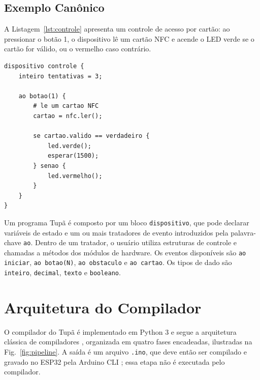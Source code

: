 \documentclass[conference]{IEEEtran}
\begin{document}
\subsection{Exemplo Canônico}
A Listagem~\ref{lst:controle} apresenta um controle de acesso por cartão: ao
pressionar o botão 1, o dispositivo lê um cartão NFC e acende o LED verde se
o cartão for válido, ou o vermelho caso contrário.

\begin{lstlisting}[language=Tupa, caption={Controle de acesso por cartão NFC em Tupã (\texttt{controle\_nfc.tupa}).}, label={lst:controle}]
dispositivo controle {
    inteiro tentativas = 3;

    ao botao(1) {
        # le um cartao NFC
        cartao = nfc.ler();

        se cartao.valido == verdadeiro {
            led.verde();
            esperar(1500);
        } senao {
            led.vermelho();
        }
    }
}
\end{lstlisting}

Um programa Tupã é composto por um bloco \texttt{dispositivo}, que pode
declarar variáveis de estado e um ou mais tratadores de evento introduzidos
pela palavra-chave \texttt{ao}. Dentro de um tratador, o usuário utiliza
estruturas de controle e chamadas a métodos dos módulos de hardware. Os
eventos disponíveis são \texttt{ao iniciar}, \texttt{ao botao(N)},
\texttt{ao obstaculo} e \texttt{ao cartao}. Os tipos de dado são
\texttt{inteiro}, \texttt{decimal}, \texttt{texto} e \texttt{booleano}.

\section{Arquitetura do Compilador}\label{sec:compilador}
O compilador do Tupã é implementado em Python 3 e segue a arquitetura
clássica de compiladores \cite{aho}, organizada em quatro fases
encadeadas, ilustradas na Fig.~\ref{fig:pipeline}. A saída é um arquivo
\texttt{.ino}, que deve então ser compilado e gravado no ESP32 pela Arduino
CLI \cite{arduinocli}; essa etapa não é executada pelo compilador.
\end{document}
